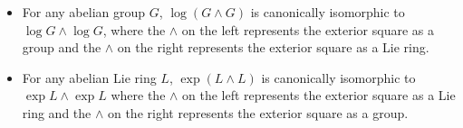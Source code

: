 \begin{itemize}
\item For any abelian group $G$, $\log(G \wedge G)$ is canonically
  isomorphic to $\log G \wedge \log G$, where the $\wedge$ on the left
  represents the exterior square as a group and the $\wedge$ on the
  right represents the exterior square as a Lie ring.
\item For any abelian Lie ring $L$, $\exp(L \wedge L)$ is canonically
  isomorphic to $\exp L \wedge \exp L$ where the $\wedge$ on the left
  represents the exterior square as a Lie ring and the $\wedge$ on the
  right represents the exterior square as a group.
\end{itemize}




